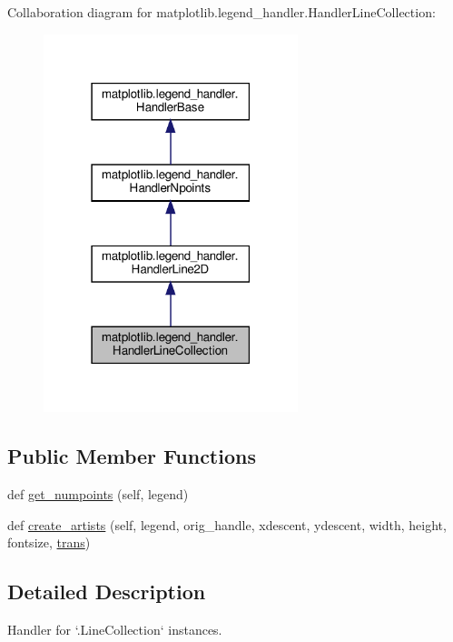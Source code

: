 Collaboration diagram for matplotlib.\+legend\+\_\+handler.\+Handler\+Line\+Collection\+:
\nopagebreak
\begin{figure}[H]
\begin{center}
\leavevmode
\includegraphics[width=210pt]{classmatplotlib_1_1legend__handler_1_1HandlerLineCollection__coll__graph}
\end{center}
\end{figure}
\subsection*{Public Member Functions}
\begin{DoxyCompactItemize}
\item 
def \hyperlink{classmatplotlib_1_1legend__handler_1_1HandlerLineCollection_a8f9b5d9c66cfaf12a55f179d6afb55f1}{get\+\_\+numpoints} (self, legend)
\item 
def \hyperlink{classmatplotlib_1_1legend__handler_1_1HandlerLineCollection_a19b02bb1f2a696c0e5404f5fb573a38e}{create\+\_\+artists} (self, legend, orig\+\_\+handle, xdescent, ydescent, width, height, fontsize, \hyperlink{size_2foo_8f90_afabfd8da71309850231a00e53c61f106}{trans})
\end{DoxyCompactItemize}


\subsection{Detailed Description}
\begin{DoxyVerb}Handler for `.LineCollection` instances.
\end{DoxyVerb}
 

